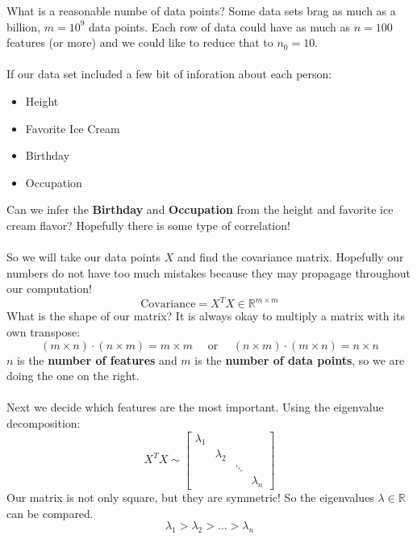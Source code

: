 \documentclass[12pt]{article}
\begin{document}
\newpage

\noindent What is a reasonable numbe of data points?  Some data sets brag as much as a billion, $m = 10^9$ data points.  Each row of data could have as much as $n = 100$ features (or more) and we could like to reduce that to $n_0 = 10$. \\ \\
If our data set included a few bit of inforation about each person:
\begin{itemize}
\item Height
\item Favorite Ice Cream
\item {\color{black!20!white} Birthday}
\item {\color{black!20!white} Occupation}
\end{itemize}
Can we infer the \textbf{Birthday}  and \textbf{Occupation} from the height and favorite ice cream flavor?  Hopefully there is some type of {\color{green!20!blue}correlation}! \\ \\
So we will take our data points $X$ and find the covariance matrix.  Hopefully our numbers do not have too much mistakes because they may propagage throughout our computation!
$$ \text{Covariance} = X^T X  \in \mathbb{R}^{m \times m}$$
What is the shape of our matrix?  It is always okay to multiply a matrix with its own transpose:
$$ (m \times n ) \cdot (n \times m) = m \times m \quad\text{ or }\quad(n \times m) \cdot (m \times n) = n \times n$$
$n$ is the \textbf{number of features}  and $m$ is the \textbf{number of data points}, so we are doing the one on the right.  \\ \\
 Next we decide which features are the most important.  Using the eigenvalue decomposition:
$$ X^T X \sim \left[ \begin{array}{cccc} \lambda_1 & & & \\ & \lambda_2 & & \\ &  &  \ddots  \\ 
& & & \lambda_n \end{array} \right] $$
Our matrix is not only square, but they are symmetric!  So the eigenvalues $\lambda \in \mathbb{R}$ can be compared.
$$ \lambda_1 > \lambda_2 > \dots > \lambda_n $$

\newpage
\end{document}
